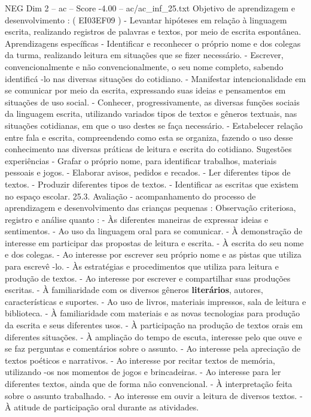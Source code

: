 \begin{textsample}{NEG Dim 2 – ac – Score -4.00 – ac/ac\_inf\_25.txt}
Objetivo de aprendizagem e desenvolvimento : ( EI03EF09 ) - Levantar hipóteses em relação à linguagem escrita, realizando registros de palavras e textos, por meio de escrita espontânea.
Aprendizagens específicas - Identificar e reconhecer o próprio nome e dos colegas da turma, realizando leitura em situações que se fizer necessário. - Escrever, convencionalmente e não convencionalmente, o seu nome completo, sabendo identificá -lo nas diversas situações do cotidiano. - Manifestar intencionalidade em se comunicar por meio da escrita, expressando suas ideias e pensamentos em situações de uso social. - Conhecer, progressivamente, as diversas funções sociais da linguagem escrita, utilizando variados tipos de textos e gêneros textuais, nas situações cotidianas, em que o uso destes se faça necessário. - Estabelecer relação entre fala e escrita, compreendendo como esta se organiza, fazendo o uso desse conhecimento nas diversas práticas de leitura e escrita do cotidiano.
Sugestões experiências - Grafar o próprio nome, para identificar trabalhos, materiais pessoais e jogos. - Elaborar avisos, pedidos e recados. - Ler diferentes tipos de textos. - Produzir diferentes tipos de textos. - Identificar as escritas que existem no espaço escolar. 25.3.
Avaliação - acompanhamento do processo de aprendizagem e desenvolvimento das crianças pequenas : Observação criteriosa, registro e análise quanto : - Às diferentes maneiras de expressar ideias e sentimentos. - Ao uso da linguagem oral para se comunicar. - À demonstração de interesse em participar das propostas de leitura e escrita. - À escrita do seu nome e dos colegas. - Ao interesse por escrever seu próprio nome e as pistas que utiliza para escrevê -lo. - Às estratégias e procedimentos que utiliza para leitura e produção de textos. - Ao interesse por escrever e compartilhar suas produções escritas. - À familiaridade com os diversos gêneros \textbf{literários}, autores, características e suportes. - Ao uso de livros, materiais impressos, sala de leitura e biblioteca. - À familiaridade com materiais e as novas tecnologias para produção da escrita e seus diferentes usos. - À participação na produção de textos orais em diferentes situações. - À ampliação do tempo de escuta, interesse pelo que ouve e se faz perguntas e comentários sobre o assunto. - Ao interesse pela apreciação de textos poéticos e narrativos. - Ao interesse por recitar textos de memória, utilizando -os nos momentos de jogos e brincadeiras. - Ao interesse para ler diferentes textos, ainda que de forma não convencional. - À interpretação feita sobre o assunto trabalhado. - Ao interesse em ouvir a leitura de diversos textos. - À atitude de participação oral durante as atividades.

\end{textsample}
